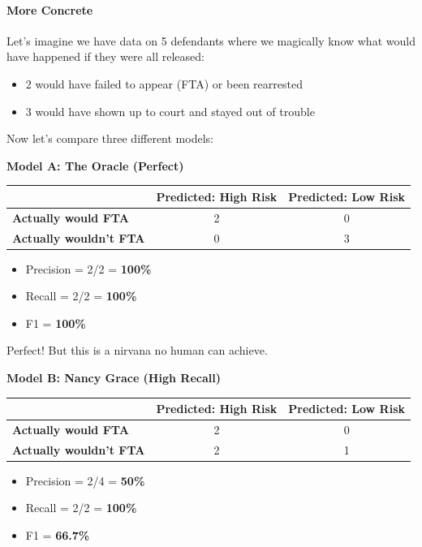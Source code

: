 \paragraph{More Concrete}

Let's imagine we have data on 5 defendants where we magically know what would have happened if they were all released:
\begin{itemize}
\item 2 would have failed to appear (FTA) or been rearrested
\item 3 would have shown up to court and stayed out of trouble
\end{itemize}

Now let's compare three different models:

\textbf{Model A: The Oracle (Perfect)}
\begin{table}[H]
\centering
\begin{tabular}{|l|c|c|}
\hline
& \textbf{Predicted: High Risk} & \textbf{Predicted: Low Risk} \\
\hline
\textbf{Actually would FTA} & 2 & 0 \\
\hline
\textbf{Actually wouldn't FTA} & 0 & 3 \\
\hline
\end{tabular}
\end{table}

\begin{itemize}
\item Precision = 2/2 = \textbf{100\%}
\item Recall = 2/2 = \textbf{100\%}
\item F1 = \textbf{100\%}
\end{itemize}

Perfect! But this is a nirvana no human can achieve.

\textbf{Model B: Nancy Grace (High Recall)}
\begin{table}[H]
\centering
\begin{tabular}{|l|c|c|}
\hline
& \textbf{Predicted: High Risk} & \textbf{Predicted: Low Risk} \\
\hline
\textbf{Actually would FTA} & 2 & 0 \\
\hline
\textbf{Actually wouldn't FTA} & 2 & 1 \\
\hline
\end{tabular}
\end{table}

\begin{itemize}
\item Precision = 2/4 = \textbf{50\%}
\item Recall = 2/2 = \textbf{100\%}
\item F1 = \textbf{66.7\%}
\end{itemize}


